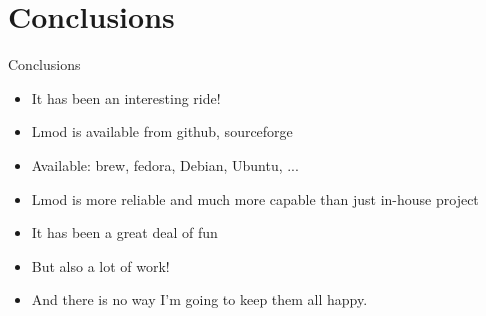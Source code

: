 \documentclass{beamer}
\begin{document}
\section{Conclusions}
\begin{frame}{Conclusions}
  \begin{itemize}
    \item It has been an interesting ride!
    \item Lmod is available from github, sourceforge
    \item Available: brew, fedora, Debian, Ubuntu, ...
    \item Lmod is more reliable and much more capable than just
      in-house project
    \item It has been a great deal of fun
    \item But also a lot of work!
    \item And there is no way I'm going to keep them all happy.
  \end{itemize}
\end{frame}
\end{document}
